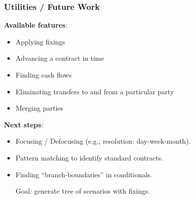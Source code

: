 \documentclass[xcolor=dvipsnames,11pt]{beamer}
\renewcommand{\emph}[1]{\textcolor{structure!90}{#1}}
\begin{document}
\begin{frame}
\frametitle{Utilities / Future Work}

\textbf{Available features}:
\begin{itemize}
  \item Applying fixings
  \item Advancing a contract in time
  \item Finding cash flows
  \item Eliminating transfers to and from a particular party
  \item Merging parties
\end{itemize}

\textbf{Next steps}:
\begin{itemize}
  \item Focusing / Defocusing  (e.g., resolution: day-week-month).
  \item Pattern matching to identify standard contracts.
  \item Finding ``branch-boundaries'' in conditionals.

      \emph{Goal:} generate tree of scenarios with fixings.
\end{itemize}
\end{frame}
\end{document}
